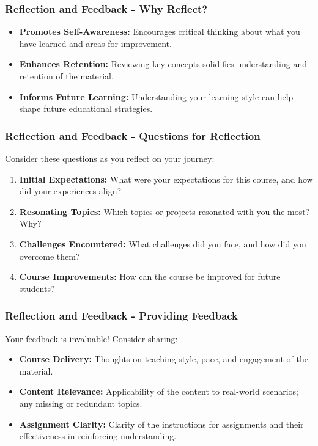 \documentclass{beamer}
\begin{document}
\begin{frame}[fragile]
    \frametitle{Reflection and Feedback - Why Reflect?}
    \begin{itemize}
        \item \textbf{Promotes Self-Awareness:} Encourages critical thinking about what you have learned and areas for improvement.
        \item \textbf{Enhances Retention:} Reviewing key concepts solidifies understanding and retention of the material.
        \item \textbf{Informs Future Learning:} Understanding your learning style can help shape future educational strategies.
    \end{itemize}
\end{frame}

\begin{frame}[fragile]
    \frametitle{Reflection and Feedback - Questions for Reflection}
    Consider these questions as you reflect on your journey:
    \begin{enumerate}
        \item \textbf{Initial Expectations:} What were your expectations for this course, and how did your experiences align?
        \item \textbf{Resonating Topics:} Which topics or projects resonated with you the most? Why?
        \item \textbf{Challenges Encountered:} What challenges did you face, and how did you overcome them?
        \item \textbf{Course Improvements:} How can the course be improved for future students?
    \end{enumerate}
\end{frame}

\begin{frame}[fragile]
    \frametitle{Reflection and Feedback - Providing Feedback}
    Your feedback is invaluable! Consider sharing:
    \begin{itemize}
        \item \textbf{Course Delivery:} Thoughts on teaching style, pace, and engagement of the material.
        \item \textbf{Content Relevance:} Applicability of the content to real-world scenarios; any missing or redundant topics.
        \item \textbf{Assignment Clarity:} Clarity of the instructions for assignments and their effectiveness in reinforcing understanding.
    \end{itemize}
\end{frame}
\end{document}
